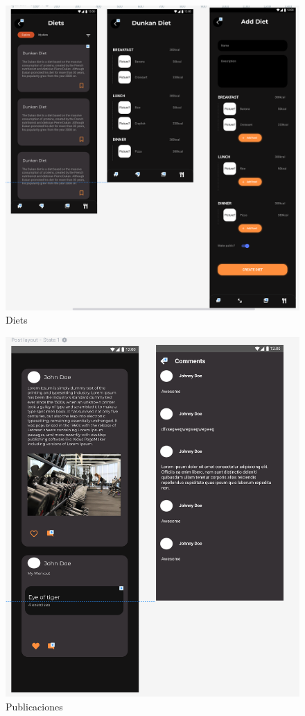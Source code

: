 \documentclass[12pt,a4paper]{article}
\begin{document}
\begin{figure}[h]
  \centering
 \includegraphics[width=1\textwidth]{diets}
 \caption{Diets}
\end{figure}


\begin{figure}[h]
  \centering
 \includegraphics[width=1\textwidth]{post}
 \caption{Publicaciones}
\end{figure}
\end{document}
